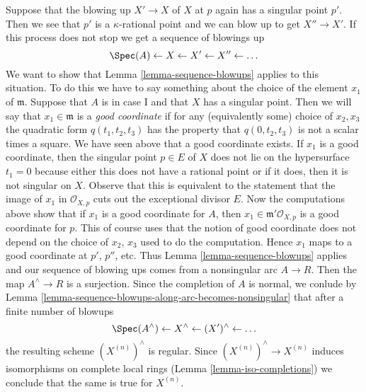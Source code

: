 \medskip\noindent
Suppose that the blowing up $X' \to X$ of $X$ at $p$ again has a
singular point $p'$. Then we see that $p'$ is a $\kappa$-rational
point and we can blow up to get $X'' \to X'$. If this process
does not stop we get a sequence of blowings up
$$
\Spec(A) \leftarrow X \leftarrow X' \leftarrow X'' \leftarrow \ldots
$$
We want to show that
Lemma \ref{lemma-sequence-blowups}
applies to this situation. To do this we have to say something
about the choice of the element $x_1$ of $\mathfrak m$.
Suppose that $A$ is in case I and that $X$ has a singular point.
Then we will say that $x_1 \in \mathfrak m$ is a {\it good coordinate}
if for any (equivalently some) choice of $x_2, x_3$ the quadratic
form $q(t_1, t_2, t_3)$ has the property that $q(0, t_2, t_3)$
is not a scalar times a square. We have seen above that a good
coordinate exists. If $x_1$ is a good coordinate, then the
singular point $p \in E$ of $X$ does not lie on the hypersurface
$t_1 = 0$ because either this does not have a rational point or
if it does, then it is not singular on $X$. Observe that this
is equivalent to the
statement that the image of $x_1$ in $\mathcal{O}_{X, p}$ cuts
out the exceptional divisor $E$. Now the computations above show
that if $x_1$ is a good coordinate for $A$, then
$x_1 \in \mathfrak m'\mathcal{O}_{X, p}$ is a good coordinate
for $p$. This of course uses that the notion of good coordinate
does not depend on the choice of $x_2$, $x_3$ used to do the
computation. Hence $x_1$ maps to a good coordinate at
$p'$, $p''$, etc. Thus
Lemma \ref{lemma-sequence-blowups}
applies and our sequence of blowing
ups comes from a nonsingular arc $A \to R$.
Then the map $A^\wedge \to R$ is a surjection.
Since the completion of $A$ is normal, we conlude by
Lemma \ref{lemma-sequence-blowups-along-arc-becomes-nonsingular}
that after a finite number of blowups
$$
\Spec(A^\wedge) \leftarrow X^\wedge \leftarrow (X')^\wedge \leftarrow \ldots
$$
the resulting scheme $(X^{(n)})^\wedge$ is regular. Since
$(X^{(n)})^\wedge \to X^{(n)}$ induces isomorphisms on complete
local rings (Lemma \ref{lemma-iso-completions}) we conclude
that the same is true for $X^{(n)}$.

